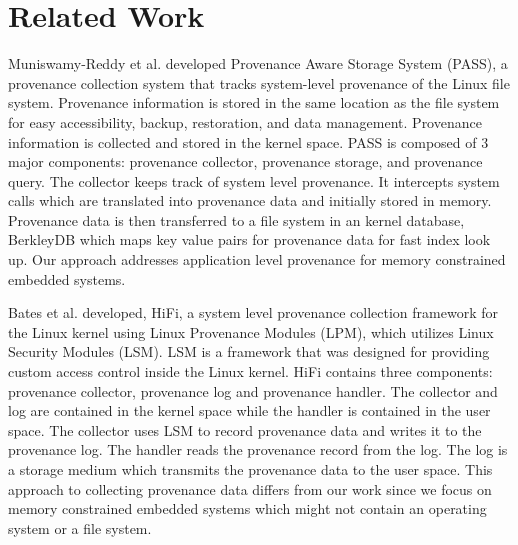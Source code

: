 \documentclass[conference]{IEEEtran}
\begin{document}
%

\section{Related Work}

Muniswamy-Reddy
et al. \cite{muniswamy_reddy} developed Provenance Aware Storage System (PASS), a provenance collection system that tracks  system-level provenance of the Linux file system. Provenance information
is stored in the same location as the file system for easy accessibility, backup,
restoration, and data management. Provenance information is collected and stored in
the kernel space. PASS is composed of 3 major components: provenance collector, provenance storage, and provenance query. The collector keeps track of system level provenance. It intercepts system calls which are translated into provenance data and initially stored in memory. Provenance data is then transferred to a file system in an kernel database, BerkleyDB which maps key value pairs for provenance data for fast index look up. Our approach addresses application level provenance for memory constrained embedded systems. 

\par Bates et al. \cite{hi_fi}  developed, HiFi, a system level provenance collection framework for the Linux kernel using Linux Provenance Modules (LPM), which utilizes Linux Security Modules (LSM). LSM is a framework that was designed for providing custom access control inside the Linux kernel. HiFi contains three components: provenance collector, provenance log and provenance handler. The collector and log are contained in the kernel space while the handler is contained in the user space. The collector uses LSM to record provenance data and writes it to the provenance log. The handler reads the provenance record from the log. The log is a storage medium which transmits the provenance data to the user space. This approach to collecting provenance data differs from our work since we focus on memory constrained embedded systems which might not contain an operating system or a file system.

\end{document}
